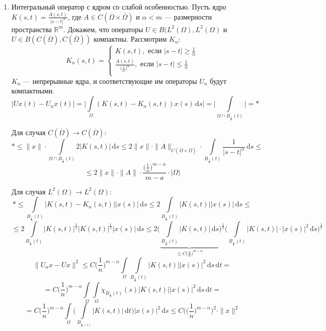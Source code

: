 \documentclass[11pt,openany,a4paper]{scrartcl}
\theoremstyle{plain}
\theoremstyle{definition}
\newcommand\mb{\mathbb}
\newcommand\real{\mb R}
\newcommand{\dif}{\, \mathrm d}
\newcommand\ol{\overline}
\begin{document}
\begin{enumerate}
    \item Интегральный оператор с ядром со слабой особенностью.
    Пусть ядро $K(s, t) = \frac{A(s, t)}{|s - t|^\alpha}$, где
    $A \in C(\ol \Omega \times \ol \Omega)$ и $\alpha < m$ — размерности пространства $\real^m$.
    Докажем, что операторы $U\in B(L^2(\Omega), L^2(\Omega)$ и
    $U \in B(C(\ol \Omega), C(\ol \Omega))$ компактны. Рассмотрим $K_n$:
    $$
    K_n(s,t) =
    \begin{cases}
        K(s, t),\text{ если } |s - t| \geqslant \frac{1}{n}\\
        \frac{A(s, t)}{\big(\frac{1}{n}\big)^\alpha},\text{ если } |s-t| \leqslant \frac{1}{n}\\
    \end{cases}
    $$
    $K_n$ — непрерывные ядра, и соответствующие им операторы $U_n$ будут компактными.
    $$
    |Ux(t) - U_nx(t)| = \bigg|\int\limits_\Omega (K(s, t) - K_n(s, t))x(s) \dif s\bigg| =
    \bigg|\int\limits_{\Omega \cap B_{\frac{1}{n}}(t)}\bigg| = \ast
    $$
    
    Для случая $C(\ol \Omega) \to C(\ol \Omega)$:
    $$
    \ast \leqslant \|x\|\cdot \int\limits_{\Omega \cap B_{\frac{1}{n}}(t)} 2|K(s, t)|\dif s
    \leqslant 2\|x\| \cdot \|A\|_{C(\ol \Omega \times \ol \Omega)} \cdot
    \int\limits_{B_{\frac{1}{n}}(t)} \frac{1}{|s-t|^\alpha}\dif s \leqslant
    $$
    $$
    \leqslant
    2\|x\|\cdot \|A\| \cdot \frac{\big(\frac{1}{n}\big)^{m-a}}{m-a}\cdot |\Omega|
    $$
    
    Для случая $L^2(\Omega) \to L^2(\Omega)$:
    $$
    \ast \leqslant \int\limits_{B_{\frac{1}{n}}(t)}|K(s, t) - K_n(s, t)||x(s)|\dif s \leqslant
    2\int\limits_{B_{\frac{1}{n}}(t)} |K(s, t)||x(s)| \dif s \leqslant
    $$
    $$
    \leqslant
    2\int\limits_{B_{\frac{1}{n}}(t)}|K(s,t)|^\frac{1}{2}|K(s,t)|^\frac{1}{2} |x(s)| \dif s 
    \leqslant
    2\bigg(\underbrace{\int\limits_{B_{\frac{1}{n}}(t)} |K(s, t)|\dif s}_{\leqslant
    C\big(\frac{1}{n}\big)^{m-\alpha}}\bigg)^\frac{1}{2}
    \bigg(\int\limits_{B_{\frac{1}{n}}(t)}|K(s, t)| \cdot |x(s)|^2 \dif s\bigg)^\frac{1}{2}
    $$
    $$
    \|U_nx - Ux\|^2 \leqslant C\Big(\frac{1}{n}\Big)^{m - \alpha}
    \int\limits_\Omega \int\limits_{B_{\frac{1}{n}}(t)}
    |K(s, t)||x(s)|^2 \dif s \dif t =
    $$
    $$
    =
    C\Big(\frac{1}{n}\Big)^{m - \alpha}
    \int\limits_\Omega\int\limits_\Omega \chi_{B_{\frac{1}{n}}(t)}(s)|K(s, t)| |x(s)|^2 \dif s \dif t
    =
    $$
    $$
    =
    C\Big(\frac{1}{n}\Big)^{m - \alpha}
    \int\limits_\Omega\bigg(
    \int\limits_{B_{\frac{1}{n}(s)}} |K(s, t)| \dif t\bigg) |x(s)|^2 \dif s \leqslant
    C\bigg(\Big(\frac{1}{n}\Big)^{m - \alpha}\bigg)^2 \cdot \|x\|^2
    $$
\end{enumerate}
\end{document}
